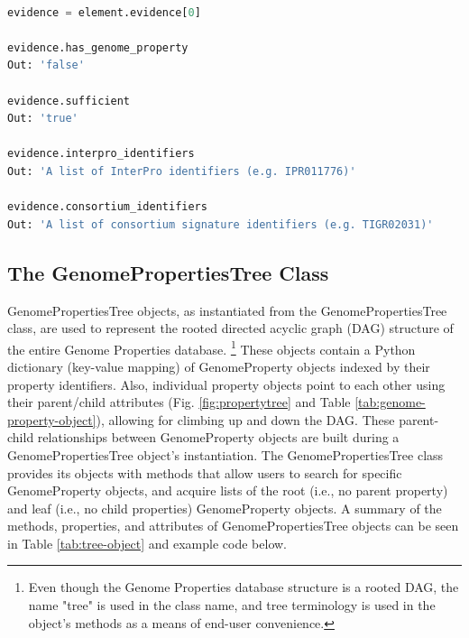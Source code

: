 \begin{lstlisting}[language=Python]

evidence = element.evidence[0]
	
evidence.has_genome_property
Out: 'false'

evidence.sufficient
Out: 'true'

evidence.interpro_identifiers
Out: 'A list of InterPro identifiers (e.g. IPR011776)'

evidence.consortium_identifiers 
Out: 'A list of consortium signature identifiers (e.g. TIGR02031)'

\end{lstlisting}

\subsection{The GenomePropertiesTree Class} \label{GenomePropertiesTree-Class}

GenomePropertiesTree objects, as instantiated from the GenomePropertiesTree class, are used to represent the rooted directed acyclic graph (DAG) structure of the entire Genome Properties database. \footnote{Even though the Genome Properties database structure is a rooted DAG, the name "tree" is used in the class name, and tree terminology is used in the object's methods as a means of end-user convenience.} These objects contain a Python dictionary (key-value mapping) of GenomeProperty objects indexed by their property identifiers. Also, individual property objects point to each other using their parent/child attributes (Fig. \ref{fig:propertytree} and Table \ref{tab:genome-property-object}), allowing for climbing up and down the DAG. These parent-child relationships between GenomeProperty objects are built during a GenomePropertiesTree object's instantiation. The GenomePropertiesTree class provides its objects with methods that allow users to search for specific GenomeProperty objects, and acquire lists of the root (i.e., no parent property) and leaf (i.e., no child properties) GenomeProperty objects. A summary of the methods, properties, and attributes of GenomePropertiesTree objects can be seen in Table \ref{tab:tree-object} and example code below.


